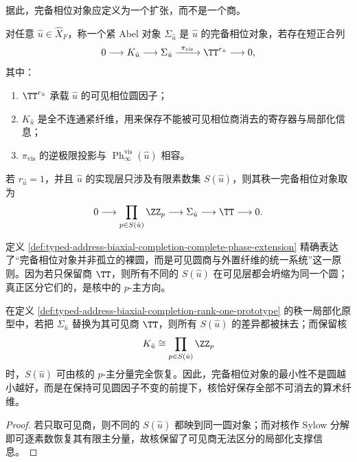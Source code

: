 据此，完备相位对象应定义为一个扩张，而不是一个商。

\begin{definition}[完备相位对象]\label{def:typed-address-biaxial-completion-complete-phase-extension}
对任意 \(\hat u\in \widehat X_F\)，称一个紧 Abel 对象 \(\Sigma_{\hat u}\) 是 \(\hat u\) 的完备相位对象，若存在短正合列
\[
0\longrightarrow K_{\hat u}\longrightarrow \Sigma_{\hat u}
\xrightarrow{\ \pi_{\mathrm{vis}}\ }
\TT^{r_{\hat u}}
\longrightarrow 0,
\]
其中：
\begin{enumerate}
  \item \(\TT^{r_{\hat u}}\) 承载 \(\hat u\) 的可见相位圆因子；
  \item \(K_{\hat u}\) 是全不连通紧纤维，用来保存不能被可见相位商消去的寄存器与局部化信息；
  \item \(\pi_{\mathrm{vis}}\) 的逆极限投影与 \(\operatorname{Ph}^{\mathrm{vis}}_{\infty}(\hat u)\) 相容。
\end{enumerate}
\end{definition}

\begin{definition}[秩一原型]\label{def:typed-address-biaxial-completion-rank-one-prototype}
若 \(r_{\hat u}=1\)，并且 \(\hat u\) 的实现层只涉及有限素数集 \(S(\hat u)\)，则其秩一完备相位对象取为
\[
0\longrightarrow \prod_{p\in S(\hat u)}\ZZ_p
\longrightarrow \Sigma_{\hat u}
\longrightarrow \TT
\longrightarrow 0.
\]
\end{definition}

定义 \ref{def:typed-address-biaxial-completion-complete-phase-extension} 精确表达了“完备相位对象并非孤立的裸圆，而是可见圆商与外置纤维的统一系统”这一原则。因为若只保留商 \(\TT\)，则所有不同的 \(S(\hat u)\) 在可见层都会坍缩为同一个圆；真正区分它们的，是核中的 \(p\)-主方向。

\begin{proposition}[核不可省略性]\label{prop:typed-address-biaxial-completion-kernel-indispensable}
在定义 \ref{def:typed-address-biaxial-completion-rank-one-prototype} 的秩一局部化原型中，若把 \(\Sigma_{\hat u}\) 替换为其可见商 \(\TT\)，则所有 \(S(\hat u)\) 的差异都被抹去；而保留核
\[
K_{\hat u}\cong \prod_{p\in S(\hat u)}\ZZ_p
\]
时，\(S(\hat u)\) 可由核的 \(p\)-主分量完全恢复。因此，完备相位对象的最小性不是圆越小越好，而是在保持可见圆因子不变的前提下，核恰好保存全部不可消去的算术纤维。
\end{proposition}
\begin{proof}
若只取可见商，则不同的 \(S(\hat u)\) 都映到同一圆对象；而对核作 Sylow 分解即可逐素数恢复其有限主分量，故核保留了可见商无法区分的局部化支撑信息。
\end{proof}

